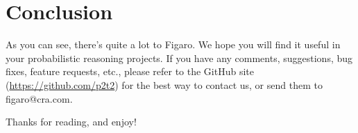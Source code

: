 
\chapter{Conclusion} %

\label{Conclusion} %


As you can see, there's quite a lot to Figaro. We hope you will find it useful in your probabilistic reasoning projects. If you have any comments, suggestions, bug fixes, feature requests, etc., please refer to the GitHub site (\url{https://github.com/p2t2}) for the best way to contact us, or send them to figaro@cra.com.

Thanks for reading, and enjoy!